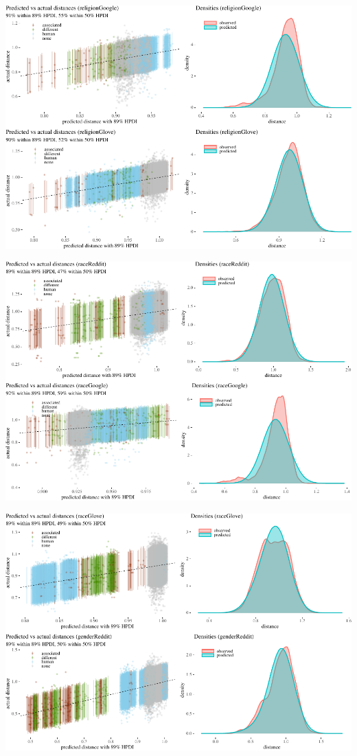 \documentclass{clv3}
\begin{document}
\label{appendix:posterior}

\begin{center}\includegraphics[width=1\linewidth ]{figures/figposteriorPrCheckAppendixa} \end{center}

\begin{center}\includegraphics[width=1\linewidth ]{figures/figposteriorPrCheckAppendixb} \end{center}

\begin{center}\includegraphics[width=1\linewidth]{figures/figposteriorPrCheckAppendixc} \end{center}
\end{document}
